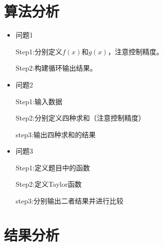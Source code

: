 \documentclass[10pt,a4paper,oneside]{article}
\begin{document}
\section{算法分析}
\begin{itemize}
  \item 问题1
  
  Step1:分别定义$f(x)$和$g(x)$，注意控制精度。

  Step2:构建循环输出结果。
  
  \item 问题2
  
  Step1:输入数据

  Step2:分别定义四种求和（注意控制精度）

  step3:输出四种求和的结果

  \item 问题3
  
  Step1:定义题目中的函数

  Step2:定义Taylor函数

  step3:分别输出二者结果并进行比较

\end{itemize}


\section{结果分析}
\end{document}
